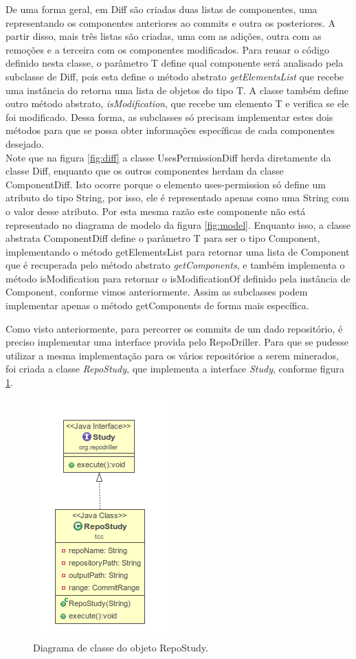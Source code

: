 \documentclass[a4paper,12pt]{article}
\begin{document}
De uma forma geral, em Diff são criadas duas listas de componentes, uma representando os componentes anteriores ao commits e outra os posteriores. A partir disso, mais três listas são criadas, uma com as adições, outra com as remoções e a terceira com os componentes modificados. Para reusar o código definido nesta classe, o parâmetro T define qual componente será analisado pela subclasse de Diff, pois esta define o método abstrato \textit{getElementsList} que recebe uma instância do  retorna uma lista de objetos do tipo T. A classe também define outro método abstrato, \textit{isModification}, que recebe um elemento T e verifica se ele foi modificado. Dessa forma, as subclasses só precisam implementar estes dois métodos para que se possa obter informações específicas de cada componentes desejado. \\

Note que na figura \ref{fig:diff} a classe UsesPermissionDiff herda diretamente da classe Diff, enquanto que os outros componentes herdam da classe ComponentDiff. Isto ocorre porque o elemento uses-permission só define um atributo do tipo String, por isso, ele é representado apenas como uma String com o valor desse atributo. Por esta mesma razão este componente não está representado no diagrama de modelo da figura \ref{fig:model}. Enquanto isso, a classe abstrata ComponentDiff define o parâmetro T para ser o tipo Component, implementando o método getElementsList para retornar uma lista de Component que é recuperada pelo método abstrato \textit{getComponents}, e também implementa o método isModification para retornar o isModificationOf  definido pela instância de Component, conforme vimos anteriormente. Assim as subclasses podem implementar apenas o método getComponents de forma mais específica.

Como visto anteriormente, para percorrer os commits de um dado repositório, é preciso implementar uma interface provida pelo RepoDriller. Para que se pudesse utilizar a mesma implementação para os vários repositórios a serem minerados, foi criada a classe \textit{RepoStudy}, que implementa a interface \textit{Study}, conforme figura \ref{fig:study}.

\begin{figure}[h]
\centering
\includegraphics[width=0.3\linewidth, height=0.45\linewidth]{imgs/study.png}
\caption{Diagrama de classe do objeto RepoStudy.}
\label{fig:study}
\end{figure}
\end{document}
